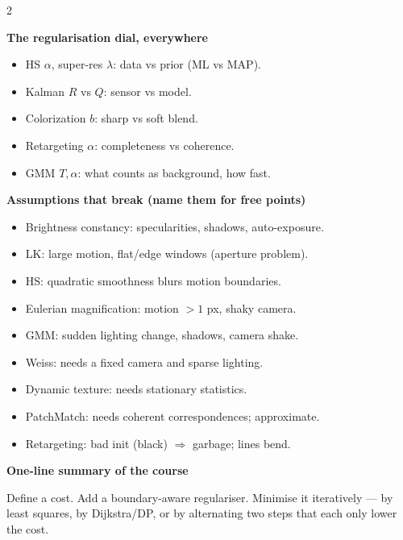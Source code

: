 \documentclass[9pt,a4paper]{extarticle}
\begin{document}
\begin{multicols}{2}
\columnbreak

\textbf{The regularisation dial, everywhere}
\begin{itemize}
  \item HS $\alpha$, super-res $\lambda$: data vs prior (ML vs MAP).
  \item Kalman $R$ vs $Q$: sensor vs model.
  \item Colorization $b$: sharp vs soft blend.
  \item Retargeting $\alpha$: completeness vs coherence.
  \item GMM $T,\alpha$: what counts as background, how fast.
\end{itemize}

\textbf{Assumptions that break (name them for free points)}
\begin{itemize}
  \item Brightness constancy: specularities, shadows, auto-exposure.
  \item LK: large motion, flat/edge windows (aperture problem).
  \item HS: quadratic smoothness blurs motion boundaries.
  \item Eulerian magnification: motion $>1$ px, shaky camera.
  \item GMM: sudden lighting change, shadows, camera shake.
  \item Weiss: needs a fixed camera and sparse lighting.
  \item Dynamic texture: needs stationary statistics.
  \item PatchMatch: needs coherent correspondences; approximate.
  \item Retargeting: bad init (black) $\Rightarrow$ garbage; lines bend.
\end{itemize}

\textbf{One-line summary of the course}
\par\smallskip
Define a cost. Add a boundary-aware regulariser. Minimise it iteratively --- by least squares, by Dijkstra/DP, or by alternating two steps that each only lower the cost.
\end{multicols}
\end{document}
